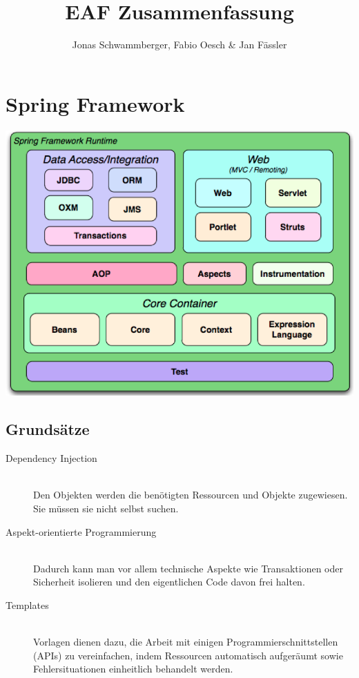 \documentclass[10pt]{scrartcl}
\title{ %
EAF Zusammenfassung}
\author{Jonas Schwammberger, Fabio Oesch \& Jan Fässler}
\begin{document}
 \maketitle
 \thispagestyle{firststyle}
 \pagestyle{firststyle}
 

 \pagestyle{documentstyle}
 \tableofcontents
 \pagebreak
\section{Spring Framework}
\begin{center}
	\includegraphics[scale=0.3]{spring.png}
\end{center}
\subsection{Grundsätze}
\begin{description}
	\item[Dependency Injection] \hfill \\
		Den Objekten werden die benötigten Ressourcen und Objekte zugewiesen. Sie müssen sie nicht selbst suchen.
	\item[Aspekt-orientierte Programmierung] \hfill \\
		Dadurch kann man vor allem technische Aspekte wie Transaktionen oder Sicherheit isolieren und den eigentlichen Code davon frei halten.
	\item[Templates] \hfill \\
		Vorlagen dienen dazu, die Arbeit mit einigen Programmierschnittstellen (APIs) zu vereinfachen, indem Ressourcen automatisch aufgeräumt sowie Fehlersituationen einheitlich behandelt werden.
\end{description}
\end{document}
